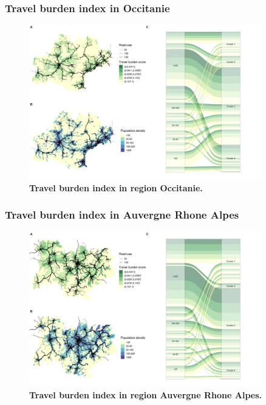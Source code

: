 \subsubsection{Travel burden index in Occitanie}

\begin{figure}[H]
    \includegraphics[width=0.9\textwidth]{images/routes/fig4_76.png}
    \centering
    \caption{
        \textbf{Travel burden index in region Occitanie.}
    }
    \label{fig:routes-burden-index-occitanie}
\end{figure}

\subsubsection{Travel burden index in Auvergne Rhone Alpes}

\begin{figure}[H]
    \includegraphics[width=0.9\textwidth]{images/routes/fig4_84.png}
    \centering
    \caption{
        \textbf{Travel burden index in region Auvergne Rhone Alpes.}
    }
    \label{fig:routes-burden-index-ara}
\end{figure}

